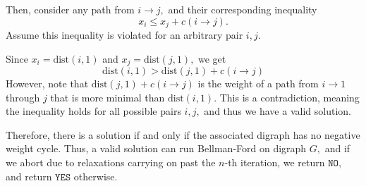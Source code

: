 \documentclass[12pt]{article}
\begin{document}
\begin{enumerate}
    Then, consider any path from $i \to j,$ and their corresponding
    inequality $$x_i \leq x_j + c(i \to j).$$ Assume this inequality
    is violated for an arbitrary pair $i, j.$

    Since $x_i = \text{dist}(i, 1)$ and $x_j = \text{dist}(j, 1),$ we get
    $$
    \text{dist}(i, 1) > \text{dist}(j, 1) + c(i \to j)
    $$
    However, note that $\text{dist}(j, 1) + c(i \to j)$ is the weight
    of a path from $i \to 1$ through $j$ that is more minimal than
    $\text{dist}(i, 1).$ This is a contradiction, meaning the
    inequality holds for all possible pairs $i, j,$ and thus we have
    a valid solution.

    Therefore, there is a solution if and only if the associated
    digraph has no negative weight cycle. Thus, a valid solution can
    run Bellman-Ford on digraph $G,$ and if we abort due to
    relaxations carrying on past the $n$-th iteration, we return
    $\texttt{NO},$ and return $\texttt{YES}$ otherwise.
\end{enumerate}
\end{document}

